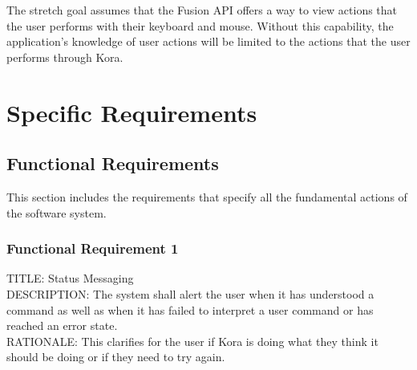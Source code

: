 \documentclass[onecolumn, draftclsnofoot,10pt, compsoc]{IEEEtran}
\def \botname{Kora\xspace}
\begin{document}
        The stretch goal assumes that the Fusion API offers a way to view actions that the user performs with their keyboard and mouse.
        Without this capability, the application's knowledge of user actions will be limited to the actions that the user performs through \botname.

\section{Specific Requirements}


    \subsection{Functional Requirements}
    This section includes the requirements that specify all the fundamental actions of the software system.
        \subsubsection{Functional Requirement 1}
        TITLE: Status Messaging \\
        DESCRIPTION: The system shall alert the user when it has understood a command as well as when it has failed to interpret a user command or has reached an error state. \\
        RATIONALE: This clarifies for the user if \botname is doing what they think it should be doing or if they need to try again. 
        
\end{document}
